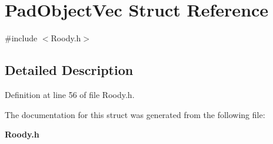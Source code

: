 \section{PadObjectVec Struct Reference}
\label{structPadObjectVec}


{\ttfamily \#include $<$Roody.h$>$}

\subsection{Detailed Description}


Definition at line 56 of file Roody.h.

The documentation for this struct was generated from the following file:\begin{DoxyCompactItemize}
\item 
{\bf Roody.h}\end{DoxyCompactItemize}
